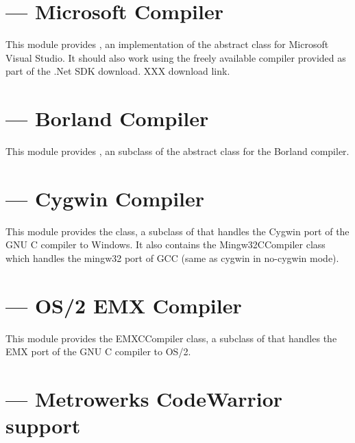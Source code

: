 \documentclass{manual}
\begin{document}
\section{ --- Microsoft Compiler}

This module provides , an implementation of the abstract 
 class for Microsoft Visual Studio. It should also work using
the freely available compiler provided as part of the .Net SDK download. XXX
download link.

\section{ --- Borland Compiler}
This module provides , an subclass of the abstract  class for the Borland \Cpp{} compiler.

\section{ --- Cygwin Compiler}

This module provides the  class, a subclass of  that
handles the Cygwin port of the GNU C compiler to Windows.  It also contains
the Mingw32CCompiler class which handles the mingw32 port of GCC (same as
cygwin in no-cygwin mode).

\section{ --- OS/2 EMX Compiler}

This module provides the EMXCCompiler class, a subclass of  that handles the EMX port of the GNU C compiler to OS/2.

\section{ --- Metrowerks CodeWarrior support}
\end{document}
